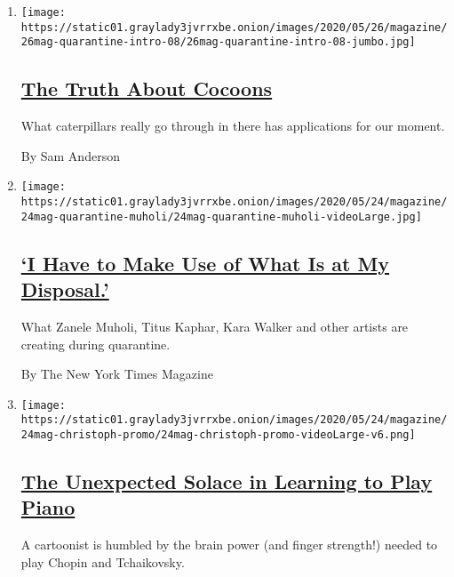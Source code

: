 \begin{enumerate}
\def\labelenumi{\arabic{enumi}.}
\item
  \texttt{[image: https://static01.graylady3jvrrxbe.onion/images/2020/05/26/magazine/26mag-quarantine-intro-08/26mag-quarantine-intro-08-jumbo.jpg]}

  \hypertarget{the-truth-about-cocoons}{%
  \subsection{\texorpdfstring{\href{/interactive/2020/05/21/magazine/covid-quarantine-self.html}{The
  Truth About
  Cocoons}}{The Truth About Cocoons}}\label{the-truth-about-cocoons}}

  What caterpillars really go through in there has applications for our
  moment.

  By Sam Anderson
\item
  \texttt{[image: https://static01.graylady3jvrrxbe.onion/images/2020/05/24/magazine/24mag-quarantine-muholi/24mag-quarantine-muholi-videoLarge.jpg]}

  \hypertarget{i-have-to-make-use-of-what-is-at-my-disposal}{%
  \subsection{\texorpdfstring{\href{/interactive/2020/05/20/magazine/covid-quarantine-art.html}{`I
  Have to Make Use of What Is at My
  Disposal.'}}{`I Have to Make Use of What Is at My Disposal.'}}\label{i-have-to-make-use-of-what-is-at-my-disposal}}

  What Zanele Muholi, Titus Kaphar, Kara Walker and other artists are
  creating during quarantine.

  By The New York Times Magazine
\item
  \texttt{[image: https://static01.graylady3jvrrxbe.onion/images/2020/05/24/magazine/24mag-christoph-promo/24mag-christoph-promo-videoLarge-v6.png]}

  \hypertarget{the-unexpected-solace-in-learning-to-play-piano}{%
  \subsection{\texorpdfstring{\href{/interactive/2020/05/20/magazine/quarantine-covid-learning-piano.html}{The
  Unexpected Solace in Learning to Play
  Piano}}{The Unexpected Solace in Learning to Play Piano}}\label{the-unexpected-solace-in-learning-to-play-piano}}

  A cartoonist is humbled by the brain power (and finger strength!)
  needed to play Chopin and Tchaikovsky.


\end{enumerate}
